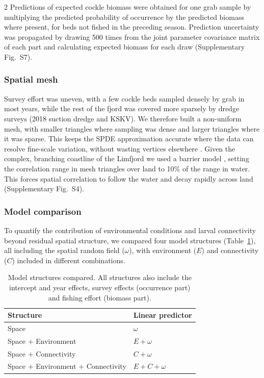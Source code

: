 \begin{spacing}{2}
Predictions of expected cockle biomass were obtained for one grab sample by multiplying the predicted probability of occurrence by the predicted biomass where present, for beds not fished in the preceding season. Prediction uncertainty was propagated by drawing 500 times from the joint parameter covariance matrix of each part and calculating expected biomass for each draw (Supplementary Fig.~S7).

\subsubsection{Spatial mesh}

Survey effort was uneven, with a few cockle beds sampled densely by grab in most years, while the rest of the fjord was covered more sparsely by dredge surveys (2018 suction dredge and KSKV). We therefore built a non-uniform mesh, with smaller triangles where sampling was dense and larger triangles where it was sparse. This keeps the SPDE approximation accurate where the data can resolve fine-scale variation, without wasting vertices elsewhere \citep{lindgren2018}. Given the complex, branching coastline of the Limfjord we used a barrier model \citep{bakkaNonstationaryGaussianModels2019}, setting the correlation range in mesh triangles over land to 10\% of the range in water. This forces spatial correlation to follow the water and decay rapidly across land (Supplementary Fig.~S4).


\subsubsection{Model comparison}

To quantify the contribution of environmental conditions and larval connectivity beyond residual spatial structure, we compared four model structures (Table~\ref{tab:model_structures}), all including the spatial random field ($\omega$), with environment ($E$) and connectivity ($C$) included in different combinations.

\begin{table}[h]
\centering
\caption{Model structures compared. All structures also include the intercept and year effects, survey effects (occurrence part) and fishing effort (biomass part).} 
\label{tab:model_structures}
\begin{tabular}{ll}
\toprule
Structure & Linear predictor \\
\midrule
Space                              & $\omega$ \\
Space   + Environment                & $E + \omega$ \\
Space   + Connectivity               & $C + \omega$ \\
Space  + Environment + Connectivity & $E + C + \omega$ \\
\bottomrule
\end{tabular}
\end{table}


\end{spacing}
